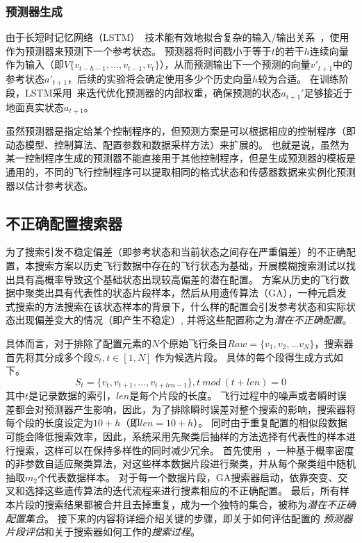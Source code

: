 \subsubsection{预测器生成}
由于长短时记忆网络（LSTM）~\cite{hochreiter1997long}技术能有效地拟合复杂的输入/输出关系~\cite{stock,highway,selvin2017stock}，\icsearcher 使用作为预测器来预测下一个参考状态。
预测器将时间戳小于等于$t$的若干$h$连续向量作为输入（即$V\{v_{t-h-1},...,v_{t-1},v_{t}\}$），从而预测输出下一个预测的向量$v'_{t+1}$中的参考状态$a'_{t+1}$，后续的实验将会确定使用多少个历史向量$h$较为合适。
在训练阶段，LSTM采用~\cite{4775883}来迭代优化预测器的内部权重，确保预测的状态$a_{t+1}'$足够接近于地面真实状态$a_{t+1}$。

虽然预测器是指定给某个控制程序的，但预测方案是可以根据相应的控制程序（即动态模型、控制算法、配置参数和数据采样方法）来扩展的。
也就是说，虽然为某一控制程序生成的预测器不能直接用于其他控制程序，但是生成预测器的模板是通用的，不同的飞行控制程序可以提取相同的格式状态和传感器数据来实例化预测器以估计参考状态。

\subsection{不正确配置搜索器}
为了搜索引发不稳定偏差（即参考状态和当前状态之间存在严重偏差）的不正确配置，本搜索方案以历史飞行数据中存在的飞行状态为基础，开展模糊搜索测试以找出具有高概率导致这个基础状态出现较高偏差的潜在配置。
方案从历史的飞行数据中聚类出具有代表性的状态片段样本，然后从用遗传算法（GA），一种元启发式搜索的方法搜索在该状态样本的背景下，什么样的配置会引发参考状态和实际状态出现偏差变大的情况（即产生不稳定）, 并将这些配置称之为\emph{潜在不正确配置}。

具体而言，对于排除了配置元素的$N$个原始飞行条目$Raw=\{v_{1},v_{2},...v_{N}\}$，搜索器首先将其分成多个段$S_{t}, t \in [1,N]$ 作为候选片段。
具体的每个段得生成方式如下。
\begin{equation}
    S_{t}=\{v_{t},v_{t+1},...,v_{t+len-1}\}, t~mod~(t+len) = 0
\end{equation}
其中$t$是记录数据的索引，$len$是每个片段的长度。
飞行过程中的噪声或者瞬时误差都会对预测器产生影响，因此，为了排除瞬时误差对整个搜索的影响，搜索器将每个段的长度设定为$10+h$（即$len=10+h$）。
同时由于重复配置的相似段数据可能会降低搜索效率，因此，系统采用先聚类后抽样的方法选择有代表性的样本进行搜索，这样可以在保持多样性的同时减少冗余。
\icsearcher 首先使用~\cite{schubert2017dbscan}，一种基于概率密度的非参数自适应聚类算法，对这些样本数据片段进行聚类，并从每个聚类组中随机抽取$m_{2}$个代表数据样本。
对于每一个数据片段，GA搜索器启动，依靠突变、交叉和选择这些遗传算法的迭代流程来进行搜素相应的不正确配置。
最后，所有样本片段的搜索结果都被合并且去掉重复，成为一个独特的集合，被称为\emph{潜在不正确配置集合}。
接下来的内容将详细介绍关键的步骤，即关于如何评估配置的 \emph{预测器片段评估}和关于搜索器如何工作的\emph{搜索过程}。

